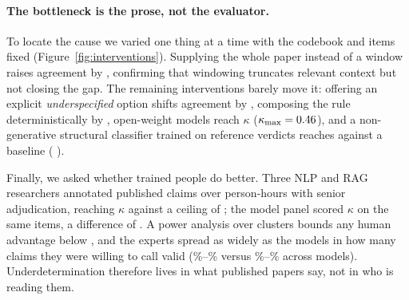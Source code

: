 \paragraph{The bottleneck is the prose, not the evaluator.}
To locate the cause we varied one thing at a time with the codebook and items fixed
(Figure~\ref{fig:interventions}). Supplying the whole paper instead of a window raises agreement
by \LadVdDeltaCite{} \LadVdDeltaCiteCI{}, confirming that windowing truncates relevant context
but not closing the gap. The remaining interventions barely move it: offering an explicit
\emph{underspecified} option shifts agreement by \AbsKDiff{} \AbsKDiffCI{}, composing the rule
deterministically by \RuleKDiff{} \RuleKDiffCI{}, \OwjNOpen{} open-weight models reach $\kappa$
\OwjKOpen{} ($\kappa_{\max}=\text{0.46{}}$), and a non-generative structural classifier
trained on reference verdicts reaches \NllVdStructAcc{} against a \NllVdBaseAcc{} baseline
(\NllVdStructdAcc{} \NllVdStructdAccCI{}).

Finally, we asked whether trained people do better. Three NLP and RAG researchers annotated
\HumN{} published claims over \HumHours{} person-hours with senior adjudication, reaching
$\kappa$ \HumVerdictK{} \HumVerdictKCI{} against a ceiling of \HumVerdictKmax{}; the model panel
scored $\kappa$ \HumModVerdictK{} on the same items, a difference of \HumGapDelta{}
\HumGapCI{}. A power analysis over \HumClusters{} clusters bounds any human advantage below
\HumMDE{}, and the experts spread as widely as the models in how many claims they were willing
to call valid (\HumSpreadLo{}\%--\HumSpreadHi{}\% versus \HumModSpreadLo{}\%--\HumModSpreadHi{}\%
across \HumModJudges{} models). Underdetermination therefore lives in what published papers say,
not in who is reading them.
